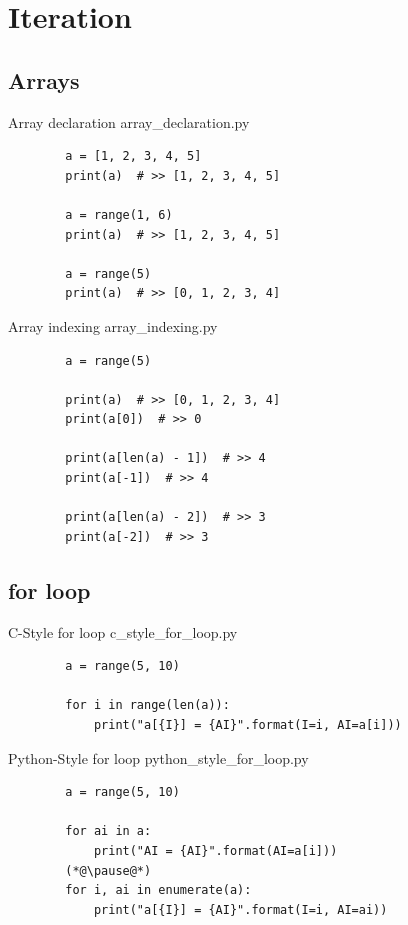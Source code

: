 \documentclass[11pt]{beamer}
\begin{document}
\section{Iteration}
\subsection{Arrays}
\begin{frame}[fragile]{Array declaration}
	array\_declaration.py
	\begin{lstlisting}
		a = [1, 2, 3, 4, 5]
		print(a)  # >> [1, 2, 3, 4, 5]
		
		a = range(1, 6)
		print(a)  # >> [1, 2, 3, 4, 5]
		
		a = range(5)
		print(a)  # >> [0, 1, 2, 3, 4]
	\end{lstlisting}
\end{frame}

\begin{frame}[fragile]{Array indexing}
	array\_indexing.py
	\begin{lstlisting}
		a = range(5)
		
		print(a)  # >> [0, 1, 2, 3, 4]
		print(a[0])  # >> 0
		
		print(a[len(a) - 1])  # >> 4
		print(a[-1])  # >> 4
		
		print(a[len(a) - 2])  # >> 3
		print(a[-2])  # >> 3
	\end{lstlisting}
\end{frame}

\subsection{for loop}
\begin{frame}[fragile]{C-Style for loop}
	c\_style\_for\_loop.py
	\begin{lstlisting}
		a = range(5, 10)
		
		for i in range(len(a)):
		    print("a[{I}] = {AI}".format(I=i, AI=a[i]))
	\end{lstlisting}
\end{frame}

\begin{frame}[fragile]{Python-Style for loop}
	python\_style\_for\_loop.py
	\begin{lstlisting}
		a = range(5, 10)
		
		for ai in a:
		    print("AI = {AI}".format(AI=a[i])) 
		(*@\pause@*)
		for i, ai in enumerate(a):
		    print("a[{I}] = {AI}".format(I=i, AI=ai))
	\end{lstlisting}
\end{frame}
\end{document}
